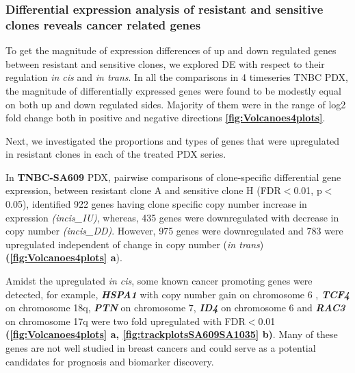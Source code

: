







\subsubsection{Differential expression analysis of resistant and sensitive clones reveals cancer related genes}
 
 To get the magnitude of expression differences of up and down regulated genes between resistant and sensitive clones, we explored \ac{DE} with respect to their regulation \textit{in cis} and \textit{in trans}. In all the comparisons in 4 timeseries TNBC PDX, the magnitude of differentially expressed genes were found to be modestly equal on both up and down regulated sides. Majority of them were in the range of log2 fold change both in positive and negative directions \textbf{\autoref{fig:Volcanoes4plots}}.
 
 Next, we investigated the proportions and types of genes that were upregulated in resistant clones in each of the treated PDX series.
 
 In \textbf{TNBC-SA609} PDX, pairwise comparisons of clone-specific differential gene expression, between resistant clone A and sensitive clone H (FDR$<$0.01, p$<$0.05), identified 922 genes having clone specific copy number increase in expression \textit{(incis\_IU)}, whereas, 435 genes were downregulated with decrease in copy number \textit{(incis\_DD)}. However, 975 genes were downregulated and 783 were upregulated independent of change in copy number (\textit{in trans}) \textbf{(\autoref{fig:Volcanoes4plots} a}). 
 
Amidst the upregulated \textit{in cis}, some known cancer promoting genes were detected, for example, \textit{\textbf{HSPA1}} \cite{zoppino2018comprehensive} with copy number gain on chromosome 6 , \textit{\textbf{TCF4}} \cite{ravindranath2011wnt} on chromosome 18q, %
\textit{\textbf{PTN}} \cite{huang2018chemotherapy} on chromosome 7,        
\textit{\textbf{ID4}} \cite{donzelli2018expression} on chromosome 6 and  
\textit{\textbf{RAC3}} \cite{donnelly2017rac3} on chromosome 17q were two fold upregulated with FDR$<$0.01 \textbf{(\autoref{fig:Volcanoes4plots} a, \autoref{fig:trackplotsSA609SA1035} b)}. Many of these genes are not well studied in breast cancers and could serve as a potential candidates for prognosis and biomarker discovery.

